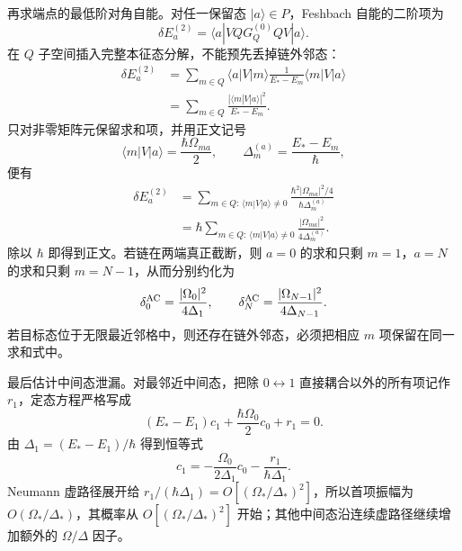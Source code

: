 \begin{derivation}[虚通道链中的有效耦合与能级移动]
再求端点的最低阶对角自能。对任一保留态 $|a\rangle\in P$，Feshbach 自能的二阶项为
\begin{equation*}
 \delta E_a^{(2)}
 =\langle a|VQG_Q^{(0)}Q V|a\rangle.
\end{equation*}
在 $Q$ 子空间插入完整本征态分解，不能预先丢掉链外邻态：
\begin{align*}
 \delta E_a^{(2)}
 &=\sum_{m\in Q}
 \langle a|V|m\rangle
 \frac1{E_*-E_m}
 \langle m|V|a\rangle\\
 &=\sum_{m\in Q}
 \frac{|\langle m|V|a\rangle|^2}{E_*-E_m}.
\end{align*}
只对非零矩阵元保留求和项，并用正文记号
\begin{equation*}
 \langle m|V|a\rangle=\frac{\hbar\Omega_{ma}}2,
 \qquad
 \Delta_m^{(a)}=\frac{E_*-E_m}{\hbar},
\end{equation*}
便有
\begin{align*}
 \delta E_a^{(2)}
 &=\sum_{m\in Q:\,\langle m|V|a\rangle\ne0}
 \frac{\hbar^2|\Omega_{ma}|^2/4}{\hbar\Delta_m^{(a)}}\\
 &=\hbar
 \sum_{m\in Q:\,\langle m|V|a\rangle\ne0}
 \frac{|\Omega_{ma}|^2}{4\Delta_m^{(a)}}.
\end{align*}
除以 $\hbar$ 即得到正文。若链在两端真正截断，则 $a=0$ 的求和只剩 $m=1$，$a=N$ 的求和只剩 $m=N-1$，从而分别约化为
\begin{equation*}
 \delta_0^{\rm AC}=\frac{|\Omega_0|^2}{4\Delta_1},
 \qquad
 \delta_N^{\rm AC}=\frac{|\Omega_{N-1}|^2}{4\Delta_{N-1}}.
\end{equation*}
若目标态位于无限最近邻格中，则还存在链外邻态，必须把相应 $m$ 项保留在同一求和式中。

最后估计中间态泄漏。对最邻近中间态，把除 $0\leftrightarrow1$ 直接耦合以外的所有项记作 $r_1$，定态方程严格写成
\begin{equation*}
 (E_*-E_1)c_1
 +\frac{\hbar\Omega_0}{2}c_0+r_1=0.
\end{equation*}
由 $\Delta_1=(E_*-E_1)/\hbar$ 得到恒等式
\begin{equation*}
 c_1
 =-\frac{\Omega_0}{2\Delta_1}c_0
 -\frac{r_1}{\hbar\Delta_1}.
\end{equation*}
Neumann 虚路径展开给 $r_1/(\hbar\Delta_1)=O[(\Omega_*/\Delta_*)^2]$，所以首项振幅为 $O(\Omega_*/\Delta_*)$，其概率从 $O[(\Omega_*/\Delta_*)^2]$ 开始；其他中间态沿连续虚路径继续增加额外的 $\Omega/\Delta$ 因子。
\end{derivation}



